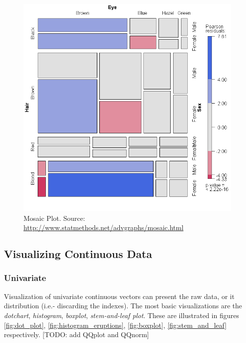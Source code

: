 \documentclass[12pt,a4paper]{report}
\begin{document}
\begin{figure}[h]
\centering
\includegraphics[height=0.3\textheight]{art/mosaic1}
\caption[Mosaic Plot]{Mosaic Plot. Source: \url{http://www.statmethods.net/advgraphs/mosaic.html}}
\label{fig:mosaic}
\end{figure}







\afterpage{\clearpage}


\subsection{Visualizing Continuous Data}




\subsubsection{Univariate}
Visualization of univariate continuous vectors can present the raw data, or it distribution (i.e.- discarding the indexes).
The most basic visualizations are the \emph{dotchart}, \emph{histogram}, \emph{boxplot}, \emph{stem-and-leaf plot}. 
These are illustrated in figures \ref{fig:dot_plot}, \ref{fig:histogram_eruptions}, \ref{fig:boxplot}, \ref{fig:stem_and_leaf} respectively. 
[TODO: add QQplot and QQnorm]
\end{document}
